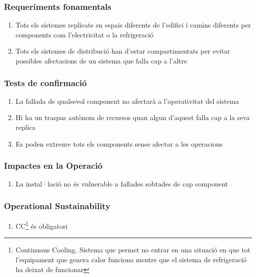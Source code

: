 \documentclass[11pt,a4paper,titlepage]{article}
\begin{document}
   \subsubsection{Requeriments fonamentals}
    \begin{enumerate}[nolistsep, label=\alph*.]
    \item Tots els sistemes replicats en espais diferents de l'edifici i camins diferents per components com l'electricitat o la refrigeració
    \item Tots els sistemes de distribució han d'estar compartimentats per evitar possibles afectacions de un sistema que falla cap a l'altre
    
    \end{enumerate}
    
    \subsubsection{Tests de confirmació}
    \begin{enumerate}[nolistsep, label=\alph*.]
    \item La fallada de qualsevol component no afectarà a l'operativitat del sistema
    \item Hi ha un traspas autònom de recursos quan algun d'aquest falla cap a la seva replica
    \item Es poden extreure tots els  components sense afectar a les operacions
    \end{enumerate}
    
    \subsubsection{Impactes en la Operació}
    \begin{enumerate}[nolistsep, label=\alph*.]
    \item La instal·lació no és vulnerable a fallades sobtades de cap component
    \end{enumerate}
    
    \subsubsection{Operational Sustainability}
    \begin{enumerate}[nolistsep, label=\alph*.]
    \item CC\footnote{Continuous Cooling. Sistema que permet no entrar en una situació en que tot l'equipament que genera calor funciona mentre que el sistema de refrigeració ha deixat de funcionar} és obligatori
    \end{enumerate}
    
\end{document}
